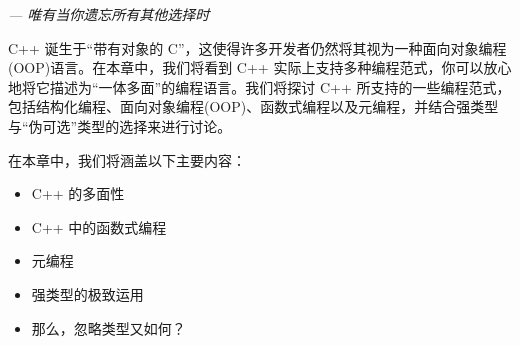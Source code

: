 
\begin{flushright}
\textit{--- 唯有当你遗忘所有其他选择时}
\end{flushright}

C++ 诞生于“带有对象的 C”，这使得许多开发者仍然将其视为一种面向对象编程(OOP)语言。在本章中，我们将看到 C++ 实际上支持多种编程范式，你可以放心地将它描述为“一体多面”的编程语言。我们将探讨 C++ 所支持的一些编程范式，包括结构化编程、面向对象编程(OOP)、函数式编程以及元编程，并结合强类型与“伪可选”类型的选择来进行讨论。

在本章中，我们将涵盖以下主要内容：

\begin{itemize}
\item 
C++ 的多面性

\item 
C++ 中的函数式编程

\item 
元编程

\item 
强类型的极致运用

\item 
那么，忽略类型又如何？
\end{itemize}

